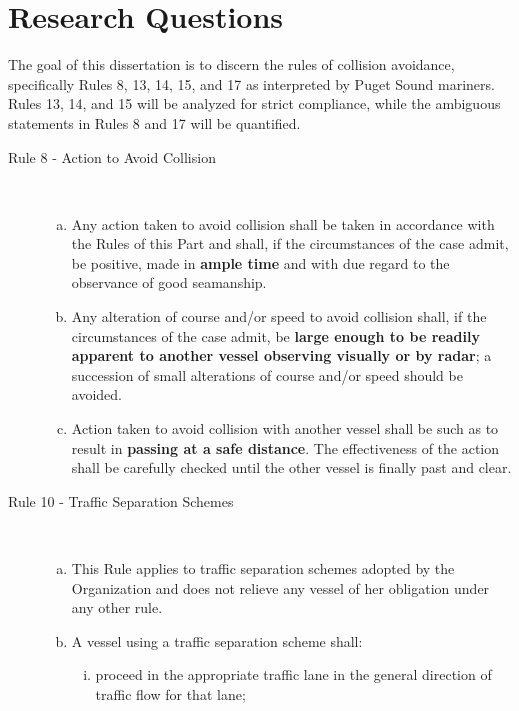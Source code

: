 \documentclass[twoside,symmetric,notoc]{tufte-book}
\begin{document}
\section{Research Questions}
\par{%
The goal of this dissertation is to discern the rules of collision avoidance, specifically Rules 8, 13, 14, 15, and 17 as interpreted by Puget Sound mariners. Rules 13, 14, and 15 will be analyzed for strict compliance, while the ambiguous statements in Rules 8 and 17 will be quantified. 
\begin{description}
\item[Rule 8 - Action to Avoid Collision] \hfill \\
    \begin{enumerate}[a.]
        \item Any action taken to avoid collision shall be taken in accordance with the Rules of this Part and shall, if the circumstances of the case admit, be positive, made in \textbf{ample time} and with due regard to the observance of good seamanship.
        \item Any alteration of course and/or speed to avoid collision shall, if the circumstances of the case admit, be \textbf{large enough to be readily apparent to another vessel observing visually or by radar}; a succession of small alterations of course and/or speed should be avoided.
        \item Action taken to avoid collision with another vessel shall be such as to result in \textbf{passing at a safe distance}. The effectiveness of the action shall be carefully checked until the other vessel is finally past and clear.
    \end{enumerate}
\newpage
\item[Rule 10 - Traffic Separation Schemes] \hfill \\
     \begin{enumerate}[a.]
        \item This Rule applies to traffic separation schemes adopted by the Organization and does not relieve any vessel of her obligation under any other rule.
        \item A vessel using a traffic separation scheme shall:
        \begin{enumerate}[(i)]
            \item  proceed in the appropriate traffic lane in the general direction of traffic flow for that lane;

\end{enumerate}
\end{enumerate}
\end{description}}
\end{document}
